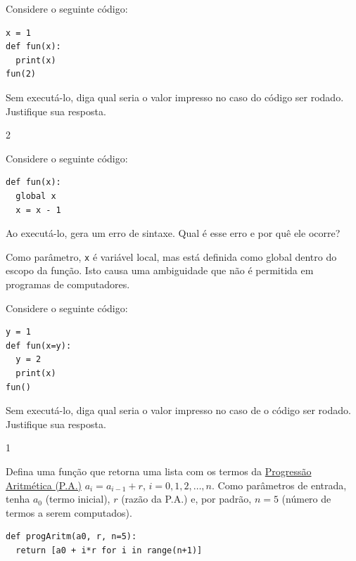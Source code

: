 \begin{exer}
  Considere o seguinte código:

\begin{lstlisting}
x = 1
def fun(x):
  print(x)
fun(2)
\end{lstlisting}
  
Sem executá-lo, diga qual seria o valor impresso no caso do código ser rodado. Justifique sua resposta.
\end{exer}
\begin{resp}
  2
\end{resp}

\begin{exer}
  Considere o seguinte código:

\begin{lstlisting}
def fun(x):
  global x
  x = x - 1
\end{lstlisting}
  
Ao executá-lo, {\python} gera um erro de sintaxe. Qual é esse erro e por quê ele ocorre?
\end{exer}
\begin{resp}
  Como parâmetro, \lstinline+x+ é variável local, mas está definida como global dentro do escopo da função. Isto causa uma ambiguidade que não é permitida em programas de computadores.
\end{resp}

\begin{exer}
  Considere o seguinte código:

\begin{lstlisting}
y = 1
def fun(x=y):
  y = 2
  print(x)
fun()
\end{lstlisting}
  
Sem executá-lo, diga qual seria o valor impresso no caso de o código ser rodado. Justifique sua resposta.
\end{exer}
\begin{resp}
  1
\end{resp}

\begin{exer}
  Defina uma função {\python} que retorna uma lista com os termos da \href{https://pt.wikipedia.org/wiki/Progress\%C3\%A3o_aritm\%C3\%A9tica}{Progressão Aritmética (P.A.)} $a_i = a_{i-1} + r$, $i = 0, 1, 2, \dotsc, n$. Como parâmetros de entrada, tenha $a_0$ (termo inicial), $r$ (razão da P.A.) e, por padrão, $n = 5$ (número de termos a serem computados).
\end{exer}
\begin{resp}

\begin{lstlisting}
def progAritm(a0, r, n=5):
  return [a0 + i*r for i in range(n+1)]
\end{lstlisting}

\end{resp}

